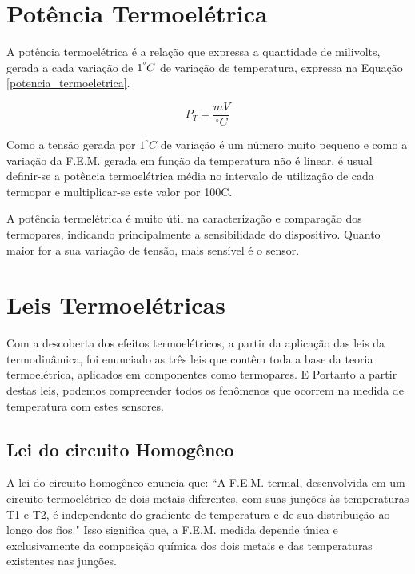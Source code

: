 \documentclass[a4paper,12pt]{report}
\begin{document}
		\section{Potência Termoelétrica}
	
	A potência termoelétrica é a relação que expressa a quantidade de milivolts, gerada a cada variação de $1^\degree C$ de variação de temperatura, expressa na Equação \ref{potencia_termoeletrica}.
	
	\begin{equation}
	P_{T} = \frac{mV}{^{\circ}C}
	\label{potencia_termoeletrica}
	\end{equation}
	
	\singlespacing
	
	Como a tensão gerada por $1^{\circ}C$ de variação é um número muito pequeno e como a variação da F.E.M. gerada em função da temperatura não é linear, é usual definir-se a potência termoelétrica média no intervalo de utilização de cada termopar e multiplicar-se este valor por 100\degree C.
	
	\singlespacing
	
	A potência termelétrica é muito útil na caracterização e comparação dos termopares, indicando principalmente a sensibilidade do dispositivo. Quanto maior for a sua variação de tensão, mais sensível é o sensor.
	
	\newpage
	\section{Leis Termoelétricas}
	
	Com a descoberta dos efeitos termoelétricos, a partir da aplicação das leis da termodinâmica, foi enunciado as três leis que contêm toda a base da teoria termoelétrica, aplicados em componentes como termopares. E Portanto a partir destas leis, podemos compreender todos os fenômenos que ocorrem na medida de temperatura com estes sensores. 
	
	\subsection{Lei do circuito Homogêneo}
	
	A lei do circuito homogêneo enuncia que: ``A F.E.M. termal, desenvolvida em um circuito termoelétrico de dois metais diferentes, com suas junções às temperaturas T1 e T2, é independente do gradiente de temperatura e de sua distribuição ao longo dos fios." Isso significa que, a F.E.M. medida depende única e exclusivamente da composição química dos dois metais e das temperaturas existentes nas junções.
	
\end{document}

